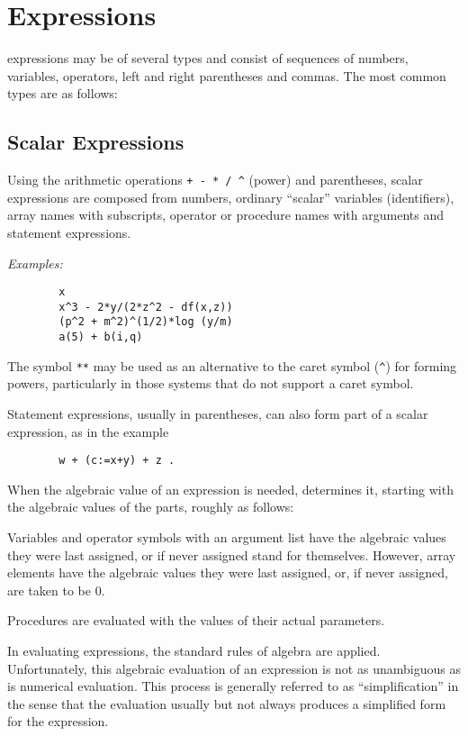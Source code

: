 \chapter{Expressions}

{\REDUCE} expressions may be of several types and consist
of sequences of numbers, variables, operators, left and right parentheses
and commas.  The most common types are as follows:

\section{Scalar Expressions}

Using the arithmetic operations \texttt{+ - * / \textasciicircum}
(power) and parentheses, scalar expressions are composed from numbers,
ordinary ``scalar'' variables (identifiers), array names with subscripts,
operator or procedure names with arguments and statement expressions.

\textit{Examples:}
\begin{verbatim}
        x
        x^3 - 2*y/(2*z^2 - df(x,z))
        (p^2 + m^2)^(1/2)*log (y/m)
        a(5) + b(i,q)
\end{verbatim}
The symbol \texttt{**} may be used as an alternative to the caret symbol
(\texttt{\textasciicircum})
for forming powers, particularly in those systems that do not support a
caret symbol.

Statement expressions, usually in parentheses, can also form part of
a scalar expression, as in the example
\begin{verbatim}
        w + (c:=x+y) + z .
\end{verbatim}
When the algebraic value of an expression is needed, {\REDUCE} determines it,
starting with the algebraic values of the parts, roughly as follows:

Variables and operator symbols with an argument list have the algebraic
values they were last assigned, or if never assigned stand for themselves.
However, array elements have the algebraic values they were last assigned,
or, if never assigned, are taken to be 0.

Procedures are evaluated with the values of their actual parameters.

In evaluating expressions, the standard rules of algebra are applied.
Unfortunately, this algebraic evaluation of an expression is not as
unambiguous as is numerical evaluation. This process is generally referred
to as ``simplification'' in the sense that the
evaluation usually but not always produces a simplified form for the
expression.


